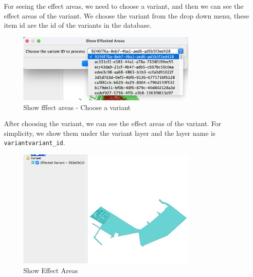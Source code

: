 For seeing the effect areas, we need to choose a variant, and then we can see the effect areas of the variant.
We choose the variant from the drop down menu, these item id are the id of the variants in the database.
\begin{figure}[H]
    \centering
    \includegraphics[width=0.8\textwidth]{res/plugin/03-show-areas}
    \caption{Show fffect areas - Choose a variant}
    \label{fig:pl-show-areas}
\end{figure}

After choosing the variant, we can see the effect areas of the variant.
For simplicity, we show them under the variant layer and the layer name is \texttt{variant\-variant\_id}.
\begin{figure}[H]
    \centering
    \includegraphics[width=0.8\textwidth]{res/plugin/04-show-areas}
    \caption{Show Effect Areas}
    \label{fig:pl-show-areas-2}
\end{figure}


